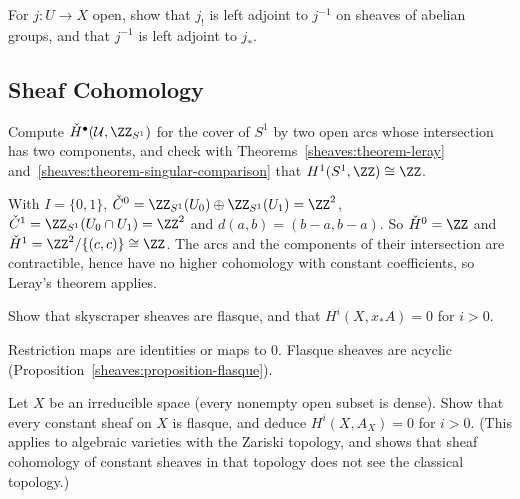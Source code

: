 \begin{exercise}\label{sheaves:exercise-restriction-open-adjoint}
For $j \colon U \to X$ open, show that $j_!$ is left adjoint to $j^{-1}$ on sheaves of abelian groups, and that $j^{-1}$ is left adjoint to $j_*$.
\end{exercise}

\subsection{Sheaf Cohomology}\label{sheaves:subsection-exercises-sheaf-cohomology}

\begin{exercise}\label{sheaves:exercise-cech-circle}
Compute $\check{H}^\bullet(\mathcal{U}, \ZZ_{S^1})$ for the cover of $S^1$ by two open arcs whose intersection has two components, and check with
Theorems~\ref{sheaves:theorem-leray} and~\ref{sheaves:theorem-singular-comparison} that $H^1(S^1, \ZZ) \cong \ZZ$.
\end{exercise}

\begin{solution}
With $I = \{0, 1\}$, $\check{C}^0 = \ZZ_{S^1}(U_0) \oplus \ZZ_{S^1}(U_1) = \ZZ^2$, $\check{C}^1 = \ZZ_{S^1}(U_0 \cap U_1) = \ZZ^2$ and $d(a, b) = (b - a, b - a)$. So $\check{H}^0 = \ZZ$ and
$\check{H}^1 = \ZZ^2/\{(c, c)\} \cong \ZZ$. The arcs and the components of their intersection are contractible, hence have no higher cohomology with constant coefficients, so Leray's theorem
applies.
\end{solution}

\begin{exercise}\label{sheaves:exercise-skyscraper-flasque}
Show that skyscraper sheaves are flasque, and that $H^i(X, x_*A) = 0$ for $i > 0$.
\end{exercise}

\begin{solution}
Restriction maps are identities or maps to $0$. Flasque sheaves are acyclic (Proposition~\ref{sheaves:proposition-flasque}).
\end{solution}

\begin{exercise}\label{sheaves:exercise-noetherian-vanishing}
Let $X$ be an irreducible space (every nonempty open subset is dense). Show that every constant sheaf on $X$ is flasque, and deduce $H^i(X, A_X) = 0$ for $i > 0$. (This applies to
algebraic varieties with the Zariski topology, and shows that sheaf cohomology of constant sheaves in that topology does not see the classical topology.)
\end{exercise}

